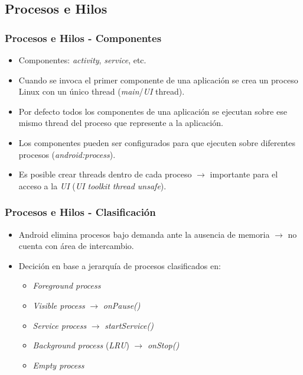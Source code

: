 \subsection{Procesos e Hilos}
\begin{frame}
  \frametitle{Procesos e Hilos - Componentes}
  \begin{itemize}
    \item Componentes: \textit{activity}, \textit{service}, etc.

    \item Cuando se invoca el primer componente de una aplicación se crea un proceso Linux con un único thread (\textit{main}/\textit{UI} thread).
    
    \item Por defecto todos los componentes de una aplicación se ejecutan sobre ese mismo thread del proceso que represente a la aplicación.
    
    \item Los componentes pueden ser configurados para que ejecuten sobre diferentes procesos (\textit{android:process}).
    
    \item Es posible crear threads dentro de cada proceso $\rightarrow$ importante para el acceso a la \textit{UI} (\emph{UI toolkit thread unsafe}).
  \end{itemize}
\end{frame}

\begin{frame}
  \frametitle{Procesos e Hilos - Clasificación}
  \begin{itemize}
    \item Android elimina procesos bajo demanda ante la ausencia de memoria $\rightarrow$ no cuenta con área de intercambio.
    
    \item Decición en base a jerarquía de procesos clasificados en:
    \begin{itemize}
     \item \textit{Foreground process}
     \item \textit{Visible process} $\rightarrow$ \textit{onPause()}
     \item \textit{Service process} $\rightarrow$ \textit{startService()}
     \item \textit{Background process} (\emph{LRU}) $\rightarrow$ \textit{onStop()}
     \item \textit{Empty process}
    \end{itemize}       
  \end{itemize}
\end{frame}

